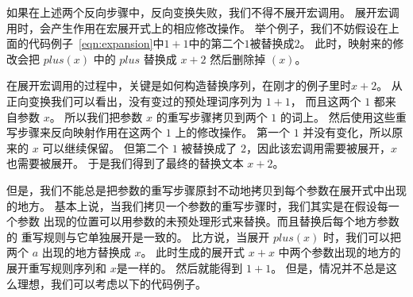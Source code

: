 如果在上述两个反向步骤中，反向变换失败，我们不得不展开宏调用。
展开宏调用时，会产生作用在宏展开式上的相应修改操作。
举个例子，我们不妨假设在上面的代码例子~\ref{eqn:expansion}中$1+1$中的第二个$1$被替换成$2$。
此时，映射来的修改会把 $plus(x)$ 中的 $plus$ 替换成 $x+2$ 然后删除掉 $(x)$。



在展开宏调用的过程中，关键是如何构造替换序列，在刚才的例子里时$x+2$。
从正向变换我们可以看出，没有变过的预处理词序列为 $1+1$， 
而且这两个 $1$ 都来自参数 $x$。
所以我们把参数 $x$ 的重写步骤拷贝到两个 $1$ 的词上。
然后使用这些重写步骤来反向映射作用在这两个 $1$ 上的修改操作。
第一个 $1$ 并没有变化，所以原来的 $x$ 可以继续保留。
但第二个 $1$ 被替换成了 $2$，因此该宏调用需要被展开，$x$ 也需要被展开。
于是我们得到了最终的替换文本 $x+2$。  



但是，我们不能总是把参数的重写步骤原封不动地拷贝到每个参数在展开式中出现的地方。
基本上说，当我们拷贝一个参数的重写步骤时，我们其实是在假设每一个参数
出现的位置可以用参数的未预处理形式来替换。而且替换后每个地方参数的
重写规则与它单独展开是一致的。
比方说，当展开 $plus(x)$ 时，我们可以把两个 $a$ 出现的地方替换成 $x$。
此时生成的展开式 $x+x$ 中两个参数出现的地方的展开重写规则序列和 $x$是一样的。
然后就能得到 $1+1$。
但是，情况并不总是这么理想，我们可以考虑以下的代码例子。

